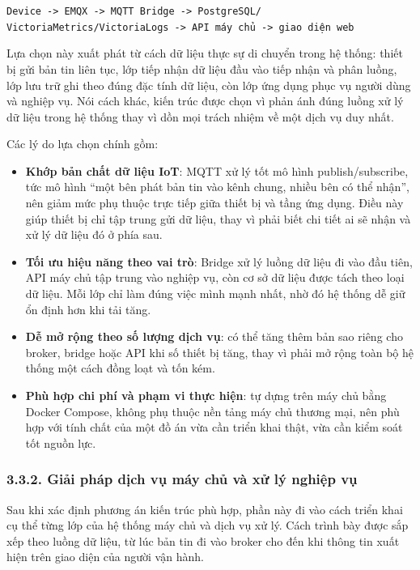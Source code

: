 \documentclass[a4paper]{extarticle}
\providecommand{\tightlist}{%
  \setlength{\itemsep}{0pt}\setlength{\parskip}{0pt}}
\begin{document}
\texttt{Device\ -\textgreater{}\ EMQX\ -\textgreater{}\ MQTT\ Bridge\ -\textgreater{}\ PostgreSQL/}\\
\texttt{VictoriaMetrics/VictoriaLogs\ -\textgreater{}\ API\ máy\ chủ\ -\textgreater{}\ giao\ diện\ web}

Lựa chọn này xuất phát từ cách dữ liệu thực sự di chuyển trong hệ thống:
thiết bị gửi bản tin liên tục, lớp tiếp nhận dữ liệu đầu vào tiếp nhận
và phân luồng, lớp lưu trữ ghi theo đúng đặc tính dữ liệu, còn lớp ứng
dụng phục vụ người dùng và nghiệp vụ. Nói cách khác, kiến trúc được
chọn vì phản ánh đúng luồng xử lý dữ liệu trong hệ thống thay vì dồn mọi
trách nhiệm về một dịch vụ duy nhất.

Các lý do lựa chọn chính gồm:

\begin{itemize}
\tightlist
\item
  \textbf{Khớp bản chất dữ liệu IoT}: MQTT xử lý tốt mô hình
  publish/subscribe, tức mô hình ``một bên phát bản tin vào kênh chung,
  nhiều bên có thể nhận'', nên giảm mức phụ thuộc trực tiếp giữa thiết
  bị và tầng ứng dụng. Điều này giúp thiết bị chỉ tập trung gửi dữ liệu,
  thay vì phải biết chi tiết ai sẽ nhận và xử lý dữ liệu đó ở phía sau.
\item
  \textbf{Tối ưu hiệu năng theo vai trò}: Bridge xử lý luồng dữ liệu đi
  vào đầu tiên, API máy chủ tập trung vào nghiệp vụ, còn cơ sở dữ
  liệu được tách theo loại dữ liệu. Mỗi lớp chỉ làm
  đúng việc mình mạnh nhất, nhờ đó hệ thống dễ giữ ổn định hơn khi tải
  tăng.
\item
  \textbf{Dễ mở rộng theo số lượng dịch vụ}: có thể tăng thêm bản sao
  riêng cho broker, bridge hoặc API khi số thiết bị tăng, thay vì phải mở rộng toàn bộ
  hệ thống một cách đồng loạt và tốn kém.
\item
  \textbf{Phù hợp chi phí và phạm vi thực hiện}: tự dựng trên máy chủ
  bằng Docker Compose, không phụ thuộc nền tảng máy chủ thương mại, nên phù hợp với
  tính chất của một đồ án vừa cần triển khai thật, vừa cần kiểm soát tốt
  nguồn lực.
\end{itemize}

\subsubsection{3.3.2. Giải pháp dịch vụ máy chủ và xử lý
nghiệp vụ}\label{323-giux1ea3i-phuxe1p-backend--cloud}

Sau khi xác định phương án kiến trúc phù hợp, phần này đi vào cách triển
khai cụ thể từng lớp của hệ thống máy chủ và dịch vụ xử lý. Cách trình
bày được sắp xếp theo luồng dữ liệu, từ lúc bản tin đi vào broker cho
đến khi thông tin xuất hiện trên giao diện của người vận hành.
\end{document}
